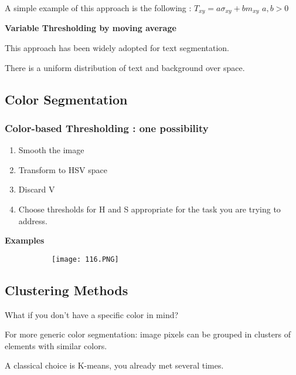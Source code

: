 \documentclass{article}
\begin{document}
A simple example of this approach is the following : $T_{xy} = a \sigma_{xy} + b m_{xy}$    $a,b > 0$

\vspace{1mm}

\textbf{Variable Thresholding by moving average}

\vspace{5mm}

This approach has been widely adopted for text segmentation.

There is a uniform distribution of text and background over space.

\subsection{Color Segmentation}

\subsubsection{Color-based Thresholding : one possibility}

\begin{enumerate}
    \item Smooth the image
    \item Transform to HSV space
    \item Discard V
    \item Choose thresholds for H and S appropriate for the task you are trying to address.
\end{enumerate}

\textbf{Examples}

\begin{figure}[ht!]
  \centering
  \begin{subfigure}[b]{0.7\linewidth}
    \texttt{[image: 116.PNG]}
  \end{subfigure}
\end{figure}

\vspace{80mm}

\subsection{Clustering Methods}

What if you don't have a specific color in mind?

For more generic color segmentation: image pixels can be grouped in clusters of elements with similar colors.

A classical choice is K-means, you already met several times.
\end{document}
